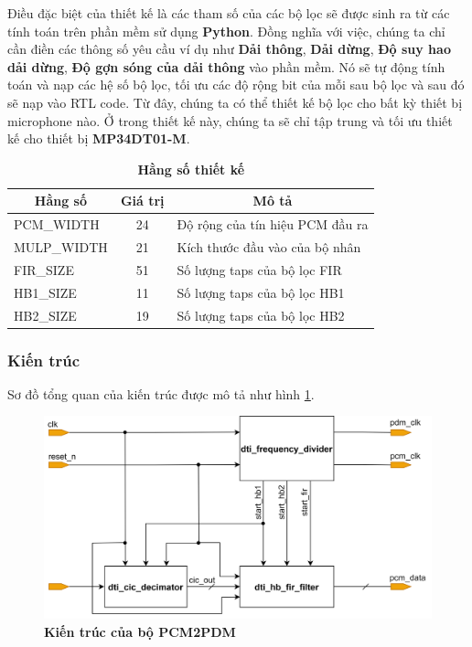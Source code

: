 Điều đặc biệt của thiết kế là các tham số của các bộ lọc sẽ được sinh ra từ các tính toán trên phần mềm sử dụng \textbf{Python}. Đồng nghĩa với việc, chúng ta chỉ cần điền các thông số yêu cầu ví dụ như \textbf{Dải thông}, \textbf{Dải dừng}, \textbf{Độ suy hao dải dừng}, \textbf{Độ gợn sóng của dải thông} vào phần mềm. Nó sẽ tự động tính toán và nạp các hệ số bộ lọc, tối ưu các độ rộng bit của mỗi sau bộ lọc và sau đó sẽ nạp vào RTL code. Từ đây, chúng ta có thể thiết kế bộ lọc cho bất kỳ thiết bị microphone nào. Ở trong thiết kế này, chúng ta sẽ chỉ tập trung và tối ưu thiết kế cho thiết bị \textbf{MP34DT01-M}.


\begin{table}[H]
    \centering
    \caption[Hằng số thiết kế]{\bfseries\fontsize{12pt}{0pt}\selectfont Hằng số thiết kế}
\begin{tabular}{|l|c|l|}
\hline
\multicolumn{1}{|c|}{\textbf{Hằng số}} & \textbf{Giá trị} & \multicolumn{1}{c|}{\textbf{Mô tả}} \\ \hline
PCM\_WIDTH  & 24 & Độ rộng của tín hiệu PCM đầu ra \\ \hline
MULP\_WIDTH & 21 & Kích thước đầu vào của bộ nhân  \\ \hline
FIR\_SIZE   & 51 & Số lượng taps của bộ lọc FIR    \\ \hline
HB1\_SIZE   & 11 & Số lượng taps của bộ lọc HB1    \\ \hline
HB2\_SIZE   & 19 & Số lượng taps của bộ lọc HB2    \\ \hline
\end{tabular}
    \label{hangso}
\end{table}
\subsubsection{Kiến trúc}
Sơ đồ tổng quan của kiến trúc được mô tả như hình \ref{arc_top}.
\begin{figure}[H]
    \centering
    \includegraphics[width=12cm]{Images/Chuong4/arc_top.png}
    \caption[Kiến trúc của bộ PCM2PDM]{\bfseries \fontsize{12pt}{0pt}\selectfont Kiến trúc của bộ PCM2PDM}
    \label{arc_top}
\end{figure}


